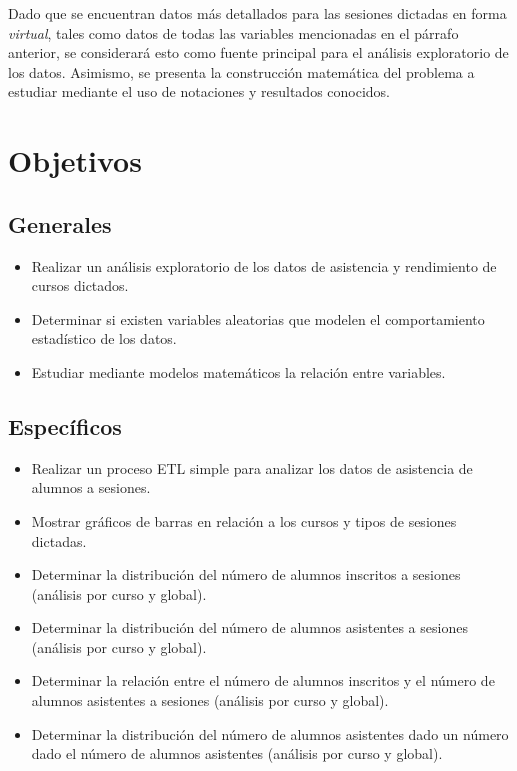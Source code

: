 \documentclass[11pt,a4paper]{book}
\theoremstyle{definition}%
\begin{document}
        Dado que se encuentran datos más detallados para las sesiones dictadas en forma \textit{virtual}, tales como datos de todas las variables mencionadas en el párrafo anterior, se considerará esto como fuente principal para el análisis exploratorio de los datos. Asimismo, se presenta la construcción matemática del problema a estudiar mediante el uso de notaciones y resultados conocidos.          
            
        \chapter{Objetivos}
            \section{Generales}
                \begin{itemize}
                    \item Realizar un análisis exploratorio de los datos de asistencia y rendimiento de cursos dictados.
                    \item Determinar si existen variables aleatorias que modelen el comportamiento estadístico de los datos.
                    \item Estudiar mediante modelos matemáticos la relación entre variables.
                \end{itemize}
            \section{Específicos}
                \begin{itemize}
                    \item Realizar un proceso ETL simple para analizar los datos de asistencia de alumnos a sesiones.
                    \item Mostrar gráficos de barras en relación a los cursos y tipos de sesiones dictadas.
                    \item Determinar la distribución del número de alumnos inscritos a sesiones (análisis por curso y global).
                    \item Determinar la distribución del número de alumnos asistentes a sesiones (análisis por curso y global).
                    \item Determinar la relación entre el número de alumnos inscritos y el número de alumnos asistentes a sesiones (análisis por curso y global).
                    \item Determinar la distribución del número de alumnos asistentes dado un número dado el número de alumnos asistentes (análisis por curso y global).
                \end{itemize}
\end{document}
